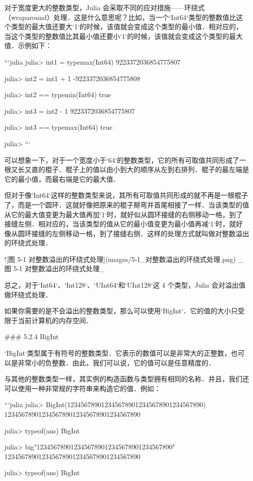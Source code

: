 对于宽度更大的整数类型，Julia 会采取不同的应对措施——环绕式（wraparound）处理．这是什么意思呢？比如，当一个`Int64`类型的整数值比这个类型的最大值还要大`1`的时候，该值就会变成这个类型的最小值．相对应的，当这个类型的整数值比其最小值还要小`1`的时候，该值就会变成这个类型的最大值．示例如下：

```julia
julia> int1 = typemax(Int64)
9223372036854775807

julia> int2 = int1 + 1
-9223372036854775808

julia> int2 == typemin(Int64)
true

julia> int3 = int2 - 1
9223372036854775807

julia> int3 == typemax(Int64)
true

julia> 
```

可以想象一下，对于一个宽度小于`64`的整数类型，它的所有可取值共同形成了一根又长又直的棍子．棍子上的值以由小到大的顺序从左到右排列．棍子的最左端是它的最小值，而最右端是它的最大值．

但对于像`Int64`这样的整数类型来说，其所有可取值共同形成的就不再是一根棍子了，而是一个圆环．这就好像把原来的棍子掰弯并首尾相接了一样．当该类型的值从它的最大值变更为最大值再加`1`时，就好似从圆环接缝的右侧移动一格，到了接缝左侧．相对应的，当该类型的值从它的最小值变更为最小值再减`1`时，就好像从圆环接缝的左侧移动一格，到了接缝右侧．这样的处理方式就叫做对整数溢出的环绕式处理．

![图 5-1 对整数溢出的环绕式处理](images/5-1_对整数溢出的环绕式处理.png)
_图 5-1 对整数溢出的环绕式处理_

总之，对于`Int64`、`Int128`、`UInt64`和`UInt128`这 4 个类型，Julia 会对溢出值做环绕式处理．

如果你需要的是不会溢出的整数类型，那么可以使用`BigInt`．它的值的大小只受限于当前计算机的内存空间．

### 5.2.4 BigInt

`BigInt`类型属于有符号的整数类型．它表示的数值可以是非常大的正整数，也可以是非常小的负整数．由此，我们可以说，它的值可以是任意精度的．

与其他的整数类型一样，其实例的构造函数与类型拥有相同的名称．并且，我们还可以使用一种非常规的字符串来构造它的值．例如：

```julia
julia> BigInt(1234567890123456789012345678901234567890)
1234567890123456789012345678901234567890

julia> typeof(ans)
BigInt

julia> big"1234567890123456789012345678901234567890"
1234567890123456789012345678901234567890

julia> typeof(ans)
BigInt

